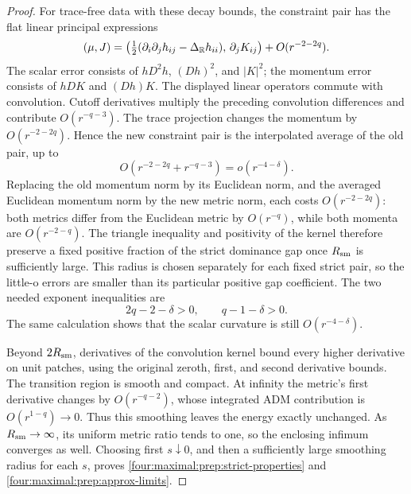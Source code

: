 \begin{proof}
For trace-free data with these decay bounds, the constraint pair has
the flat linear principal expressions
\begin{equation}
 (\mu,J)
 =\left(\tfrac12(\partial_i\partial_jh_{ij}
                      -\Delta_\mathbb R h_{ii}),\,
                   \partial_jK_{ij}\right)
     +O(r^{-2-2q}).
\label{four:maximal:prep:linear-constraints}
\end{equation}
The scalar error consists of \(hD^2h\), \((Dh)^2\), and
\(|K|^2\); the momentum error consists of \(hDK\) and \((Dh)K\).
The displayed linear operators commute with convolution.  Cutoff
derivatives multiply the preceding convolution differences and
contribute \(O(r^{-q-3})\).  The trace projection changes the
momentum by \(O(r^{-2-2q})\).  Hence the new constraint pair is the
interpolated average of the old pair, up to
\begin{equation}
 O(r^{-2-2q}+r^{-q-3})=o(r^{-4-\delta}).
\label{four:maximal:prep:smoothing-errors}
\end{equation}
Replacing the old momentum norm by its Euclidean norm, and the averaged
Euclidean momentum norm by the new metric norm, each costs
\(O(r^{-2-2q})\): both metrics differ from the Euclidean metric by
\(O(r^{-q})\), while both momenta are \(O(r^{-2-q})\).
The triangle inequality and positivity
of the kernel therefore preserve a fixed positive fraction of the strict
dominance gap once \(R_{\rm sm}\) is sufficiently large.  This radius is
chosen separately for each fixed strict pair, so the little-o errors are
smaller than its particular positive gap coefficient.  The two needed
exponent inequalities are
\[
 2q-2-\delta>0,\qquad q-1-\delta>0.
\]
The same calculation shows that the scalar curvature is still
\(O(r^{-4-\delta})\).

Beyond \(2R_{\rm sm}\), derivatives of the convolution kernel
bound every higher derivative on unit patches, using the original
zeroth, first, and second derivative bounds.  The transition region
is smooth and compact.  At infinity the metric's first derivative
changes by \(O(r^{-q-2})\), whose integrated ADM contribution is
\(O(r^{1-q})\to0\).  Thus this smoothing leaves the energy exactly
unchanged.  As \(R_{\rm sm}\to\infty\), its uniform metric ratio
tends to one, so the enclosing infimum converges as well.  Choosing
first \(s\downarrow0\), and then a sufficiently large smoothing
radius for each \(s\), proves \eqref{four:maximal:prep:strict-properties} and
\eqref{four:maximal:prep:approx-limits}.
\end{proof}

